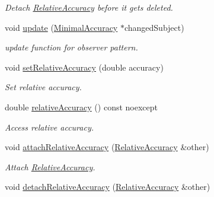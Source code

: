 \begin{DoxyCompactItemize}
\begin{DoxyCompactList}\small\item\em Detach \hyperlink{classSpacy_1_1Mixin_1_1RelativeAccuracy}{Relative\+Accuracy} before it gets deleted. \end{DoxyCompactList}\item 
\hypertarget{classSpacy_1_1Mixin_1_1MinimalAccuracy_a98dc7eb03f50165f6f2e0df17c2b7d44}{}void \hyperlink{classSpacy_1_1Mixin_1_1MinimalAccuracy_a98dc7eb03f50165f6f2e0df17c2b7d44}{update} (\hyperlink{classSpacy_1_1Mixin_1_1MinimalAccuracy_a9dc80f566f27efbd48c43c7f7c0961c2_a9dc80f566f27efbd48c43c7f7c0961c2}{Minimal\+Accuracy} $\ast$changed\+Subject)\label{classSpacy_1_1Mixin_1_1MinimalAccuracy_a98dc7eb03f50165f6f2e0df17c2b7d44}

\begin{DoxyCompactList}\small\item\em update function for observer pattern. \end{DoxyCompactList}\item 
void \hyperlink{classSpacy_1_1Mixin_1_1RelativeAccuracy_aee88b71e80aca446a179f1310408a1e3_aee88b71e80aca446a179f1310408a1e3}{set\+Relative\+Accuracy} (double accuracy)
\begin{DoxyCompactList}\small\item\em Set relative accuracy. \end{DoxyCompactList}\item 
double \hyperlink{classSpacy_1_1Mixin_1_1RelativeAccuracy_a1da618cf9265c2edae354524df4a7f8a_a1da618cf9265c2edae354524df4a7f8a}{relative\+Accuracy} () const noexcept
\begin{DoxyCompactList}\small\item\em Access relative accuracy. \end{DoxyCompactList}\item 
void \hyperlink{classSpacy_1_1Mixin_1_1RelativeAccuracy_ae299bb5419df551cc93c6397e5b1b58b_ae299bb5419df551cc93c6397e5b1b58b}{attach\+Relative\+Accuracy} (\hyperlink{classSpacy_1_1Mixin_1_1RelativeAccuracy_ad843319a8782b47291fa31334e8bbd2a_ad843319a8782b47291fa31334e8bbd2a}{Relative\+Accuracy} \&other)
\begin{DoxyCompactList}\small\item\em Attach \hyperlink{classSpacy_1_1Mixin_1_1RelativeAccuracy}{Relative\+Accuracy}. \end{DoxyCompactList}\item 
\hypertarget{classSpacy_1_1Mixin_1_1RelativeAccuracy_a2636cde30aab8415e19e25fc12489e57}{}void \hyperlink{classSpacy_1_1Mixin_1_1RelativeAccuracy_a2636cde30aab8415e19e25fc12489e57}{detach\+Relative\+Accuracy} (\hyperlink{classSpacy_1_1Mixin_1_1RelativeAccuracy_ad843319a8782b47291fa31334e8bbd2a_ad843319a8782b47291fa31334e8bbd2a}{Relative\+Accuracy} \&other)\label{classSpacy_1_1Mixin_1_1RelativeAccuracy_a2636cde30aab8415e19e25fc12489e57}


\end{DoxyCompactItemize}

